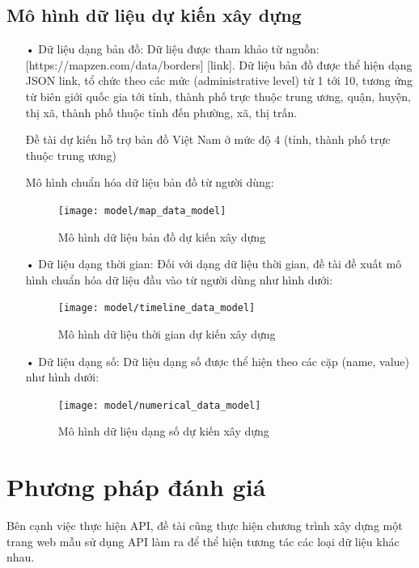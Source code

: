 \documentclass[12pt,a4paper,oneside]{article}
\begin{document}
\subsection{Mô hình dữ liệu dự kiến xây dựng}
\begin{itemize}
\item[•] Dữ liệu dạng bản đồ: 
Dữ liệu được tham khảo từ nguồn: [https://mapzen.com/data/borders] [link]. 
Dữ liệu bản đồ được thể hiện dạng JSON link, tổ chức theo các mức (administrative level) từ 1 tới 10, tương ứng từ biên giới quốc gia tới tỉnh, thành phố trực thuộc trung ương, quận, huyện, thị xã, thành phố thuộc tỉnh đến phường, xã, thị trấn.

Đề tài dự kiến hỗ trợ bản đồ Việt Nam ở mức độ 4 (tỉnh, thành phố trực thuộc trung ương)

Mô hình chuẩn hóa dữ liệu bản đồ từ người dùng:
\begin{figure}[htp]
    \texttt{[image: model/map\_data\_model]}
    \caption{Mô hình dữ liệu bản đồ dự kiến xây dựng}
    \label{refhinh17}
\end{figure}

\item[•] Dữ liệu dạng thời gian:
Đối với dạng dữ liệu thời gian, đề tài đề xuất mô hình chuẩn hóa dữ liệu đầu vào từ người dùng như hình dưới:
\begin{figure}[htp]
    \texttt{[image: model/timeline\_data\_model]}
    \caption{Mô hình dữ liệu thời gian dự kiến xây dựng}
    \label{refhinh18}
\end{figure}

\item[•] Dữ liệu dạng số:
Dữ liệu dạng số được thể hiện theo các cặp (name, value) như hình dưới:
\begin{figure}[htp]
    \texttt{[image: model/numerical\_data\_model]}
    \caption{Mô hình dữ liệu dạng số dự kiến xây dựng}
    \label{refhinh19}
\end{figure}

\end{itemize}

\section{Phương pháp đánh giá}
Bên cạnh việc thực hiện API, đề tài cũng thực hiện chương trình xây dựng một trang web mẫu sử dụng API làm ra để thể hiện tương tác các loại dữ liệu khác nhau.
\end{document}
